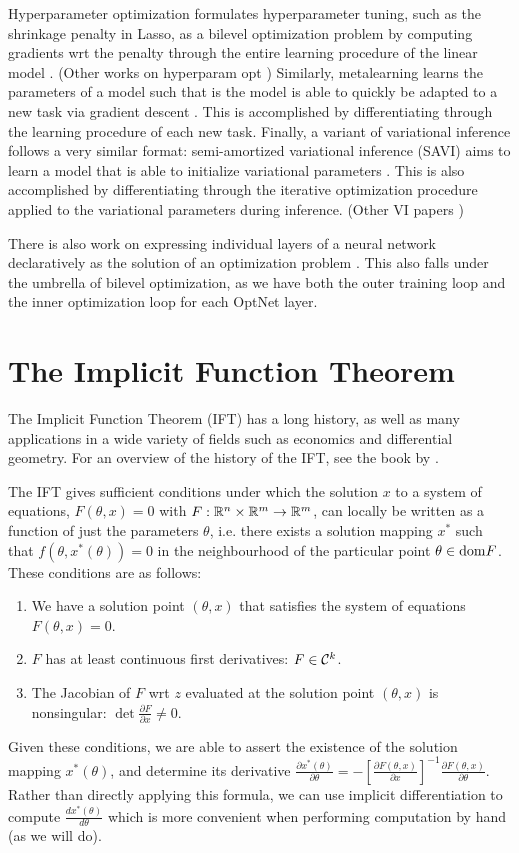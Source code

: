 \documentclass[11pt]{article}
\begin{document}
Hyperparameter optimization formulates hyperparameter tuning, such as the shrinkage penalty in Lasso,
as a bilevel optimization problem by computing gradients wrt the penalty through the entire learning procedure
of the linear model \citep{lorraine2019implasso}.
(Other works on hyperparam opt \citep{maclaurin2015reversible,bertrand2020implicit})
Similarly, metalearning learns the parameters of a model such that is the model is able to quickly
be adapted to a new task via gradient descent \citep{finn2017maml,rajeswaran2019impmaml}.
This is accomplished by differentiating through the learning procedure of each new task.
Finally, a variant of variational inference follows a very similar format:
semi-amortized variational inference (SAVI) aims to learn a model that is able to initialize
variational parameters \citep{kim2018savi}.
This is also accomplished by differentiating through the iterative optimization procedure
applied to the variational parameters during inference.
(Other VI papers \citep{vi,johnson2017pgm})

There is also work on expressing individual layers of a neural network declaratively
as the solution of an optimization problem \citep{optnet,agrawal2019diffcvx,gould2019declarative}.
This also falls under the umbrella of bilevel optimization, as we have both the outer training loop
and the inner optimization loop for each OptNet layer.

\section{The Implicit Function Theorem}
The Implicit Function Theorem (IFT) has a long history, as well as many applications
in a wide variety of fields such as economics and differential geometry.
For an overview of the history of the IFT, see the book by \citet{iftbook}.

The IFT gives sufficient conditions under which the solution $x$
to a system of equations, $F(\theta, x) = 0$ with $F: \mathbb{R}^n\times\mathbb{R}^m\to\mathbb{R}^m$,
can locally be written as a function of just the parameters $\theta$,
i.e. there exists a solution mapping $x^*$
such that $f(\theta, x^*(\theta)) = 0$ in the neighbourhood of the particular point
$\theta\in\mathrm{dom } F$.
These conditions are as follows:
\begin{enumerate}
\item We have a solution point $(\theta, x)$ that satisfies the system of equations
    $F(\theta, x) = 0$.
\item $F$ has at least continuous first derivatives: $F \in \mathcal{C}^k$.
\item The Jacobian of $F$ wrt $z$ evaluated at the solution point $(\theta,x)$ is nonsingular:
    $\det \frac{\partial F}{\partial x} \neq 0$.
\end{enumerate}
Given these conditions, we are able to assert the existence of the solution mapping $x^*(\theta)$,
and determine its derivative
$\frac{\partial x^*(\theta)}{\partial \theta} = -[\frac{\partial F(\theta,x)}{\partial x}]^{-1}
    \frac{\partial F(\theta,x)}{\partial \theta}$.
Rather than directly applying this formula,
we can use implicit differentiation to compute $\frac{dx^*(\theta)}{d\theta}$
which is more convenient when performing computation by hand (as we will do).
\end{document}

